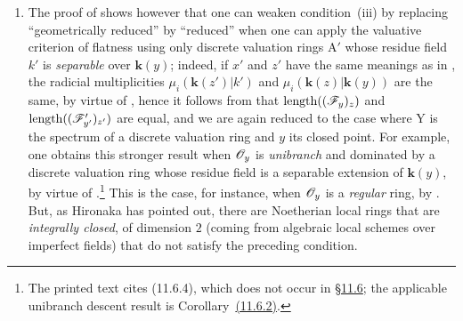 \begin{remarks}[15.2.4]
\begin{enumerate}[label=(\roman*)]
To construct the rings $\mathrm{A}$ and $\mathrm{A}'$, let us start from an imperfect field $k$ of characteristic $p>0$; let $\mathrm{K}_0=k((\mathrm{T}))$ be the field of formal Laurent series over $k$, and let $\mathrm{A}_0$ be its valuation ring for the discrete valuation given by the order of a formal Laurent series; the residue field of $\mathrm{A}_0$ is thus $k$.
Let $\alpha$ be an element of $k$ that is not a $p$-th power, and let us take $k'=k(\alpha^{1/p})$; $\mathrm{K}=k'((\mathrm{T}))$ is then a finite radicial extension of $\mathrm{K}_0$, and $\mathrm{A}'=\mathrm{A}_0\otimes_k k'$ is the discrete valuation ring for $\mathrm{K}$.
If $\mathfrak{m}'$ is the maximal ideal of $\mathrm{A}'$, conditions~$1)$ and $2)$ are satisfied by taking $\mathrm{A}=\mathrm{A}_0+\mathfrak{m}'$: indeed, as $\mathrm{A}_0$ is Noetherian and $\mathrm{A}'$ is an $\mathrm{A}_0$-module of finite type, $\mathrm{A}$ is a finite $\mathrm{A}_0$-algebra, hence a Noetherian ring; since $\mathrm{A}'$ is finite over $\mathrm{A}$, $\mathfrak{m}'$ is the only maximal ideal of $\mathrm{A}$, which is thus a complete local ring, evidently of dimension $1$ (being finite over $\mathrm{A}_0$) and geometrically unibranch, since $\mathrm{A}'$ is integrally closed and has the same field of fractions $\mathrm{K}$ as $\mathrm{A}$.
  \item The proof of  shows however that one can weaken condition~(iii) by replacing ``geometrically reduced'' by ``reduced'' when one can apply the valuative criterion of flatness  using only discrete valuation rings $\mathrm{A}'$ whose residue field $k'$ is \emph{separable} over $\mathbf{k}(y)$; indeed, if $x'$ and $z'$ have the same meanings as in , the radicial multiplicities $\mu_i(\mathbf{k}(z')|k')$ and $\mu_i(\mathbf{k}(z)|\mathbf{k}(y))$ are the same, by virtue of , hence it follows from  that $\operatorname{length}((\mathscr{F}_y)_z)$ and $\operatorname{length}((\mathscr{F}_{y'}')_{z'})$ are equal, and we are again reduced to the case where $\mathrm{Y}$ is the spectrum of a discrete valuation ring and $y$ its closed point.
For example, one obtains this stronger result when $\mathscr{O}_y$ is \emph{unibranch} and dominated by a discrete valuation ring whose residue field is a separable extension of $\mathbf{k}(y)$, by virtue of .\footnote{The printed text cites (11.6.4), which does not occur in {\hyperref[subsection:IV.11.6]{\S11.6}}; the applicable unibranch descent result is Corollary~{\hyperref[IV.11.6.2]{(11.6.2)}}.}
This is the case, for instance, when $\mathscr{O}_y$ is a \emph{regular} ring, by .
But, as Hironaka has pointed out, there are Noetherian local rings that are \emph{integrally closed}, of dimension $2$ (coming from algebraic local schemes over imperfect fields) that do not satisfy the preceding condition.
\end{enumerate}
\end{remarks}

